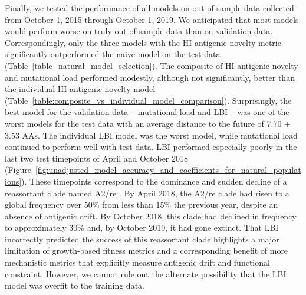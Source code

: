 \begin{figure}
  \label{figsupp:validation_of_naive_model_for_natural_populations}

  \label{figsupp:test_of_naive_model_for_natural_populations}

\end{figure}

Finally, we tested the performance of all models on out-of-sample data collected from October 1, 2015 through October 1, 2019.
We anticipated that most models would perform worse on truly out-of-sample data than on validation data.
Correspondingly, only the three models with the HI antigenic novelty metric significantly outperformed the naive model on the test data (Table~\ref{table_natural_model_selection}).
The composite of HI antigenic novelty and mutational load performed modestly, although not significantly, better than the individual HI antigenic novelty model (Table~\ref{table:composite_vs_individual_model_comparison}).
Surprisingly, the best model for the validation data -- mutational load and LBI -- was one of the worst models for the test data with an average distance to the future of 7.70 $\pm$ 3.53 AAs.
The individual LBI model was the worst model, while mutational load continued to perform well with test data.
LBI performed especially poorly in the last two test timepoints of April and October 2018 (Figure~\ref{fig:unadjusted_model_accuracy_and_coefficients_for_natural_populations}).
These timepoints correspond to the dominance and sudden decline of a reassortant clade named A2/re \citep{Potter2019}.
By April 2018, the A2/re clade had risen to a global frequency over 50\% from less than 15\% the previous year, despite an absence of antigenic drift.
By October 2018, this clade had declined in frequency to approximately 30\% and, by October 2019, it had gone extinct.
That LBI incorrectly predicted the success of this reassortant clade highlights a major limitation of growth-based fitness metrics and a corresponding benefit of more mechanistic metrics that explicitly measure antigenic drift and functional constraint.
However, we cannot rule out the alternate possibility that the LBI model was overfit to the training data.

